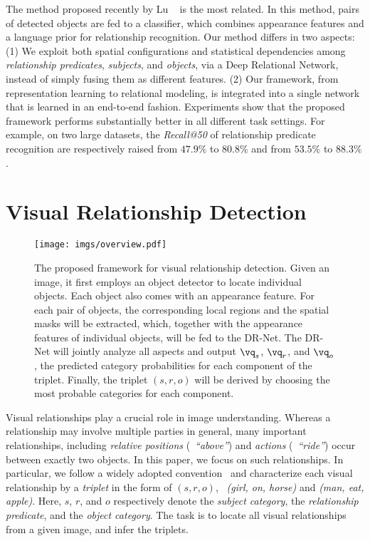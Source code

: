 \documentclass[10pt,twocolumn,letterpaper]{article}
\begin{document}
The method proposed recently by Lu \etal~\cite{lu2016visual} is the most related. 
In this method, pairs of detected objects are fed to a classifier, which combines
appearance features and a language prior for relationship recognition. 
Our method differs in two aspects:
(1) We exploit both spatial configurations and statistical dependencies among 
\emph{relationship predicates}, \emph{subjects}, and \emph{objects},
via a Deep Relational Network, instead of simply fusing them as different features.
(2) Our framework, from representation learning to relational modeling, is integrated 
into a single network that is learned in an end-to-end fashion.
Experiments show that the proposed framework performs substantially better in 
all different task settings. For example, on two large datasets, 
the \emph{Recall@50} of relationship predicate recognition are respectively raised from 
$47.9\%$ to $80.8\%$ and from $53.5\%$ to $88.3\%$. 

\section{Visual Relationship Detection}\label{sec:ovalfrm}\begin{figure*}
    \centering
    \texttt{[image: imgs/overview.pdf]}
    \caption{\small
    The proposed framework for visual relationship detection.
    Given an image, it first employs an object detector to locate individual objects.
    Each object also comes with an appearance feature.
    For each pair of objects, the corresponding local regions and the spatial masks 
    will be extracted, which, together with the appearance features 
    of individual objects, will be fed to the DR-Net. 
    The DR-Net will jointly analyze all aspects
    and output $\vq_s$, $\vq_r$, and $\vq_o$, the predicted category 
    probabilities for each component of the triplet. 
    Finally, the triplet $(s, r, o)$ will be derived by choosing the most probable 
    categories for each component.}
    \label{fig:overview}
\end{figure*}

Visual relationships play a crucial role in image understanding.
Whereas a relationship may involve multiple parties in general,
many important relationships, including
\emph{relative positions} (\eg~\emph{``above''}) and
\emph{actions} (\eg~\emph{``ride''}) occur between exactly two objects.  
In this paper, we focus on such relationships.
In particular, we follow a widely adopted convention~\cite{sadeghi2011recognition,lu2016visual}
and characterize each visual relationship by a \emph{triplet}
in the form of $(s, r, o)$, 
\eg~\emph{(girl, on, horse)} and \emph{(man, eat, apple)}.
Here, $s$, $r$, and $o$ respectively
denote the \emph{subject category}, the \emph{relationship predicate}, and
the \emph{object category}. 
The task is to locate all visual relationships from a given image, 
and infer the triplets. 
\end{document}

